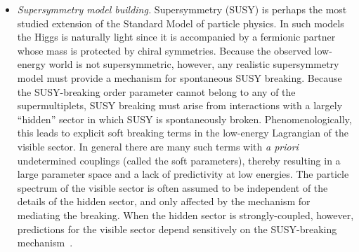 \begin{itemize}
\item{\it Supersymmetry model building.}  Supersymmetry (SUSY) is perhaps the
most studied extension of the Standard Model of particle physics. In such
models the Higgs is naturally light since it is accompanied by a fermionic
partner whose mass is protected by chiral symmetries.  Because the observed
low-energy world is not supersymmetric, however, any realistic supersymmetry
model must provide a mechanism for spontaneous SUSY breaking.  Because the
SUSY-breaking order parameter cannot belong to any of the supermultiplets,
SUSY breaking must arise from interactions with a largely ``hidden'' sector in
which SUSY is spontaneously broken.  Phenomenologically, this leads to
explicit soft breaking terms in the low-energy Lagrangian of the visible
sector.  In general there are many such terms with {\it a priori} undetermined
couplings (called the soft parameters), thereby resulting in a large parameter
space and a lack of predictivity at low energies.  The particle spectrum of
the visible sector is often assumed to be independent of the details of the
hidden sector, and only affected by the mechanism for mediating the breaking.
When the hidden sector is strongly-coupled, however, predictions for the
visible sector depend sensitively on the SUSY-breaking
mechanism~\cite{Cohen:2006qc,Murayama:2007ge}.


\end{itemize}
